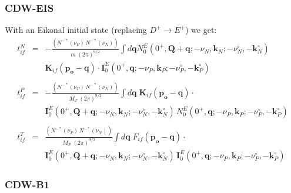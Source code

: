 \subsubsection{CDW-EIS}

With an Eikonal initial state (replacing $D^{+} \to E^{+}$) we get:
\begin{eqnarray}\label{Q:tn_if-cdw-eis}
t^{N}_{if}&=& -\frac{\left(N^{-*}(\nu_{P}) \,N^{-*}(\nu_{N}) \right)}{m
\; (2 \pi)^{9/2}} \int d \bm{q} N^{E}_{0}(0^{+}, \bm{Q} + \bm{q};
-\nu_{N}, \bm{k}_{N}; -\nu_{N}^{\circ}, -\bm{k}_{N}^{\circ} ) \,
  \\
&& \bm{K}_{if}(\bm{p_{o}}- \bm{q}) \cdot \bm{I}^{E}_{0}( 0^{+} , \bm{q}
; -\nu_{P}, \bm{k}_{P} ; -\nu_{P}^{\circ}, -\bm{k}_{P}^{\circ}) \nonumber
  \\
\nonumber \\
t^{P}_{if} &=& -\frac{\left(N^{-*}(\nu_{P}) \,N^{-*}(\nu_{N})
\right)}{M_{T} \; (2 \pi)^{9/2}} \int d \bm{q} \;
\bm{K}_{if}(\bm{p_{o}}- \bm{q}) \cdot
  \\
&& \bm{I}^{E}_{0}(0^{+}, \bm{Q} + \bm{q}; -\nu_{N}, \bm{k}_{N};
-\nu_{N}^{\circ}, -\bm{k}_{N}^{\circ} ) \,  N^{E}_{0}( 0^{+} ,
\bm{q};-\nu_{P},\bm{k}_{P}; -\nu_{P}^{\circ}, -\bm{k}_{P}^{\circ}) \nonumber
\\
\nonumber \\
t^{T}_{if}&=& \frac{\left(N^{-*}(\nu_{P}) \,N^{-*}(\nu_{N})
\right)}{M_{P} \; (2 \pi)^{9/2}} \int d \bm{q} \; F_{if}(\bm{p_{o}}-
\bm{q}) \cdot
  \\
&& \bm{I}^{E}_{0}(0^{+}, \bm{Q} + \bm{q}; -\nu_{N}, \bm{k}_{N};
-\nu_{N}^{\circ}, -\bm{k}_{N}^{\circ} ) \,  \bm{I}^{E}_{0}( 0^{+} ,
\bm{q};-\nu_{P},\bm{k}_{P}; -\nu_{P}^{\circ}, -\bm{k}_{P}^{\circ}) \nonumber
\end{eqnarray}

\subsubsection{CDW-B1}

